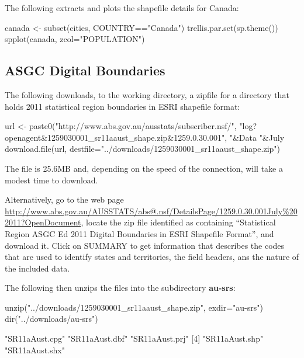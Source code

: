\documentclass{tufte-book}\usepackage[]{graphicx}\usepackage[]{color}
\begin{document}
{The following extracts and plots the shapefile details for Canada:
\begin{Schunk}
\begin{Sinput}
canada <- subset(cities, COUNTRY=="Canada")
trellis.par.set(sp.theme())
spplot(canada, zcol="POPULATION")
\end{Sinput}
\end{Schunk}

\subsection*{ASGC Digital Boundaries}

The following downloads, to the working directory, a zipfile for
a directory that holds 2011 statistical region boundaries in ESRI
shapefile format:
\begin{Schunk}
\begin{Sinput}
url <- paste0("http://www.abs.gov.au/ausstats/subscriber.nsf/",
  "log?openagent&1259030001_sr11aaust_shape.zip&1259.0.30.001",
  "&Data%
  "&July%
download.file(url, destfile="../downloads/1259030001_sr11aaust_shape.zip")
\end{Sinput}
\end{Schunk}
\noindent
The file is 25.6MB and, depending on the speed of the connection,
will take a modest time to download.

Alternatively, go to the web page
  \url{http://www.abs.gov.au/AUSSTATS/abs@.nsf/DetailsPage/1259.0.30.001July%202011?OpenDocument},
    locate the zip file identified as containing ``Statistical
    Region ASGC Ed 2011 Digital Boundaries in ESRI Shapefile Format'',
    and download it.  Click on SUMMARY to get information that
    describes the codes that are used to identify states and
    territories, the field headers, ans the nature of the included
    data.

The following then unzips the files into the
subdirectory {\bf au-srs}:
\begin{Schunk}
\begin{Sinput}
unzip("../downloads/1259030001_sr11aaust_shape.zip", exdir="au-srs")
dir("../downloads/au-srs")
\end{Sinput}
\begin{Soutput}
[1] "SR11aAust.cpg" "SR11aAust.dbf" "SR11aAust.prj"
[4] "SR11aAust.shp" "SR11aAust.shx"
\end{Soutput}
\end{Schunk}

}
\end{document}
